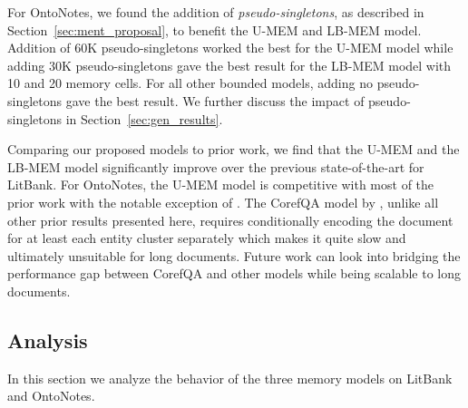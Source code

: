 \documentclass[12pt]{thesis-umich}[thesis]
\newcommand{\unbounded}{U-MEM\xspace}
\newcommand{\learned}{LB-MEM\xspace}
\begin{document}
For OntoNotes, we found the addition of \emph{pseudo-singletons}, as described in Section~\ref{sec:ment_proposal}, to benefit the \unbounded and \learned model. Addition of 60K pseudo-singletons worked the best for the \unbounded model while adding 30K pseudo-singletons gave the best result for the \learned model with 10 and 20 memory cells. For all other bounded models, adding no pseudo-singletons gave the best result. We further discuss the impact of pseudo-singletons in Section~\ref{sec:gen_results}.


Comparing our proposed models to prior work, we find that the \unbounded and the \learned model significantly improve over the previous state-of-the-art for LitBank.
For OntoNotes, the \unbounded model is competitive with most of the prior work with the notable exception of \citet{wu-etal-2020-corefqa}.  
The CorefQA model by \citet{wu-etal-2020-corefqa}, unlike all other prior results presented here, requires conditionally encoding the document for at least each entity cluster separately which makes it quite slow and ultimately unsuitable for long documents. Future work can look into bridging the performance gap between CorefQA and other models while being scalable to long documents.






\subsection{Analysis}
In this section we analyze the behavior of the three memory models on LitBank and OntoNotes.
\end{document}
